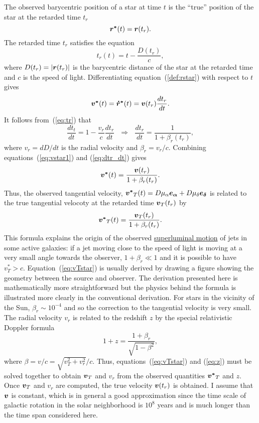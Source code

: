 \documentclass[12pt]{article}
\newcommand \beq {\begin{equation}}
\newcommand \eeq {\end{equation}}
\newcommand{\ve}[1]{\mbox{\boldmath $#1$}}
\begin{document}
The observed barycentric position of a star at time $t$ is the ``true'' position 
of the star at the retarded time $t_r$ 
\beq
  \ve{r^*}(t) = \ve{r}(t_r) .
\label{def:rstar}
\eeq
The retarded time $t_r$ satisfies the equation 
\beq
  t_r(t) = t - \frac{D(t_r)}{c} ,
\label{eq:tr}
\eeq
where $D(t_r) = |\ve{r}(t_r)|$ is the barycentric distance of the star 
at the retarded time and $c$ is the speed of light. Differentiating 
equation~(\ref{def:rstar}) with respect 
to $t$ gives 
\beq
  \ve{v^*}(t) = \ve{\dot{r}^*}(t) = \ve{v}(t_r) \frac{d t_r}{dt} .
\label{eq:vstar1}
\eeq
It follows from~(\ref{eq:tr}) that 
\beq
  \frac{dt_t}{dt} = 1-\frac{v_r}{c} \frac{dt_r}{dt} \ \ \ \Rightarrow \ \ \ 
  \frac{dt_r}{dt} = \frac{1}{1+\beta_r(t_r)} ,
\label{eq:dtr_dt}
\eeq
where $v_r = d D/dt$ is the radial velocity and $\beta_r = v_r/c$. Combining 
equations~(\ref{eq:vstar1}) and (\ref{eq:dtr_dt}) gives 
\beq
  \ve{v^*}(t) = \frac{\ve{v}(t_r)}{1+\beta_r(t_r)} .
\eeq
Thus, the observed tangential velocity, $\ve{v^*}_T(t)=D\mu_{\alpha}\ve{e_{\alpha}} 
+ D \mu_{\delta} \ve{e_{\delta}}$ is related to the true 
tangential velocoty at the retarded time $\ve{v}_T(t_r)$ by 
\beq
   \ve{v^*}_T(t) = \frac{\ve{v}_T(t_r)}{1+\beta_r(t_r)} .
\label{eq:vTstar}
\eeq
This formula explains the origin of the observed 
\href{https://en.wikipedia.org/wiki/Superluminal_motion}{superluminal motion} 
of jets in some active galaxies: if a jet moving close to the speed of light 
is moving at a very small angle towards the observer, $1+\beta_r \ll 1$ and 
it is possible to have $v^*_T > c$. Equation~(\ref{eq:vTstar}) is usually derived by 
drawing a figure showing the geometry between the source and observer. 
The derivation presented here is mathematically more straightforward but 
the physics behind the formula is illustrated more clearly in the conventional 
derivation. For stars in the vicinity of the Sun, 
$\beta_r \sim 10^{-4}$ and so the correction to the tangential 
velocity is very small. The radial velocity $v_r$ is related to the redshift $z$ 
by the special relativistic Doppler formula 
\beq
  1 + z = \frac{1+\beta_r}{\sqrt{1-\beta^2}} ,
\label{eq:z}
\eeq
where $\beta = v/c = \sqrt{v_T^2+v_r^2}/c$. Thus, equations~(\ref{eq:vTstar}) 
and (\ref{eq:z}) must be solved together to obtain $\ve{v}_T$ and $v_r$ 
from the observed quantities $\ve{v^*}_T$ and $z$. Once $\ve{v}_T$ and 
$v_r$ are computed, the true velocity $\ve{v}(t_r)$ is obtained. I assume that 
$\ve{v}$ is constant, which is in general a good approximation since the time scale of 
galactic rotation in the solar neighborhood is $10^8$ years and is much longer 
than the time span considered here.
\end{document}
